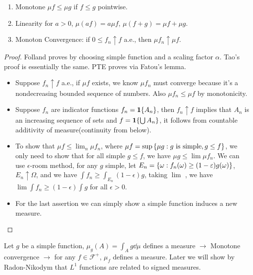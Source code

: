 \begin{thm}
    \begin{enumerate}
        \item Monotone \(\mu f \leq \mu g\) if \(f \leq g\) pointwise.
        \item Linearity for \(a > 0\), \(\mu (af) = a \mu f\), \(\mu(f + g)=  \mu f + \mu g\).
        \item Monoton Convergence: if \(0 \leq f_{n} \uparrow f\) a.e., then \(\mu f_{n} \uparrow \mu f\). 
    \end{enumerate}
\end{thm}
\begin{proof}
    Folland proves by choosing simple function and a scaling factor \(\alpha\). Tao's proof is essentially the same.
    PTE proves via Fatou's lemma. 
    \begin{itemize}
    \item
    Suppose \(f_{n}\uparrow f\) a.e., if \(\mu f\) exists, we know \(\mu f_{n}\) must converge because it's a nondecreasing bounded sequence of numbers. Also \(\mu f_{n} \leq \mu f\) by monotonicity. 
    \item Suppose \(f_{n}\) are indicator functions \(f_{n} = \mathbf{1}\{A_{n}\}\), then \(f_{n} \uparrow f\) implies that \(A_{n}\) is an increasing sequence of sets and \(f = \mathbf{1}\{\bigcup A_{n}\}\), it follows from countable additivity of measure(continuity from below). 
    \item
    To show that \(\mu f \leq \lim_{n} \mu f_{n}\), where \(\mu f = \sup \Bqty{\mu g: g \text{ is simple}, g \leq f}\), we only need to show that for all simple \(g \leq f\), we have \(\mu g \leq \lim \mu f_{n}\). We can use \(\epsilon\)-room method, for any \(g\) simple, let \(E_{n} = \Bqty{\omega: f_{n}(\omega) \geq (1 - \epsilon) g(\omega)}\), \(E_{n} \uparrow \Omega\), and we have \(\int f_{n} \geq \int_{E_{n}} (1 - \epsilon)g\), taking \(\lim\) , we have \(\lim \int f_{n} \geq (1 - \epsilon) \int g\) for all \(\epsilon> 0\). 
    \item For the last assertion we can simply show a simple function induces a new measure. 
    \end{itemize}
\end{proof}

\begin{remark}
    Let \(g\) be a simple function, \(\mu_{g}(A) = \int_{A} g \dd{\mu} \) defines a measure \(\rightarrow\) Monotone convergence \(\rightarrow\) for any \(f \in \mathcal{F}^{+}\), \(\mu_{f}\) defines a measure. Later we will show by Radon-Nikodym that \(L^{1}\) functions are related to signed measures.
\end{remark}

